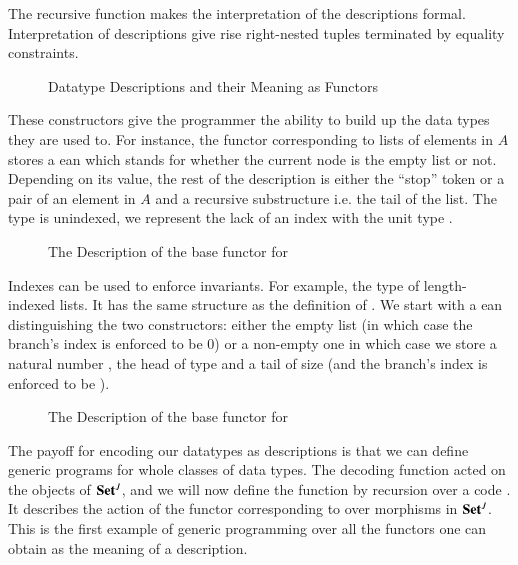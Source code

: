 The recursive function  makes the interpretation of the
descriptions formal. Interpretation of descriptions give rise right-nested tuples
terminated by equality constraints.

\begin{figure}[h]
\begin{minipage}{0.45\textwidth}
\end{minipage}\hfill
\begin{minipage}{0.45\textwidth}
\end{minipage}
\caption{Datatype Descriptions and their Meaning as Functors}\label{figure:desc}
\end{figure}

These constructors give the programmer the ability to build up the data
types they are used to. For instance, the functor corresponding
to lists of elements in $A$ stores a ean which stands for whether
the current node is the empty list or not. Depending on its value, the
rest of the description is either the ``stop'' token or a pair of an element
in $A$ and a recursive substructure i.e. the tail of the list. The  type
is unindexed, we represent the lack of an index with the unit type \AD{$\top$}.

\begin{figure}[h]
\caption{The Description of the base functor for  }\label{figure:listD}
\end{figure}

Indexes can be used to enforce invariants. For example, the type {  }
of length-indexed lists. It has the same structure as the definition of .
We start with a ean distinguishing the two constructors: either
the empty list (in which case the branch's index is enforced to be $0$) or a
non-empty one in which case we store a natural number , the head of type
 and a tail of size  (and the branch's index is enforced to be
 ).

\begin{figure}[h]
\caption{The Description of the base functor for   }\label{figure:vecD}
\end{figure}

The payoff for encoding our datatypes as descriptions is that we can define
generic programs for whole classes of data types. The decoding function 
acted on the objects of $\mathbf{Set}{}^J$, and we will now define the function  by
recursion over a code . It describes the action of the functor corresponding
to  over morphisms in $\mathbf{Set}{}^J$. This is the first example of generic
programming over all the functors one can obtain as the meaning of a description.

